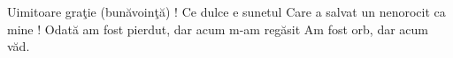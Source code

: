 Uimitoare graţie (bunăvoinţă) !
Ce dulce e sunetul
Care a salvat un nenorocit ca mine !
Odată am fost pierdut, dar acum m-am regăsit
Am fost orb, dar acum văd. 
